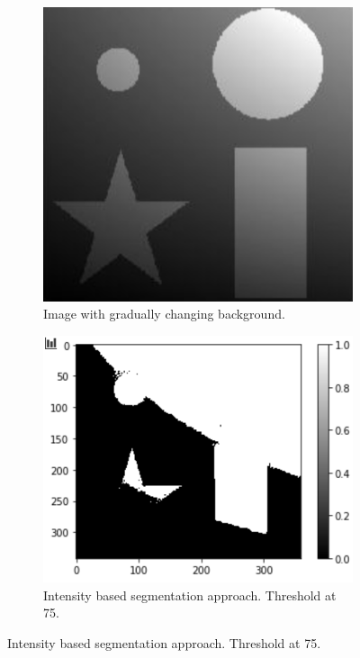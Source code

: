 \begin{figure}[H]
	\centering
	\begin{subfigure}[b]{0.45\linewidth}
		\centering
		\includegraphics[width=0.8\linewidth]{Materials/E4/background}
		\caption{Image with gradually changing background.\\\hfill}
	\end{subfigure}
	\hfill
	\begin{subfigure}[b]{0.45\linewidth}
		\centering
		\includegraphics[width=\linewidth]{Materials/E4/intens_seg_res}
		\caption{Intensity based segmentation approach. Threshold at 75.}
	\end{subfigure}

\end{figure}
